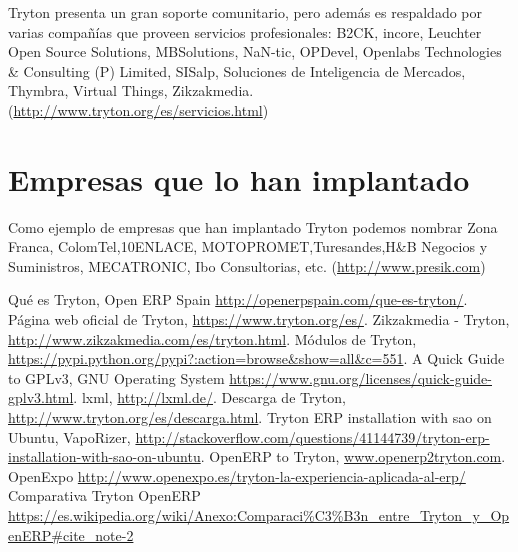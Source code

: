 \documentclass{article}
\begin{document}
Tryton presenta un gran soporte comunitario, pero además es respaldado por varias compañías que proveen servicios profesionales:
B2CK, incore, Leuchter Open Source Solutions, MBSolutions, NaN-tic, OPDevel, Openlabs Technologies  \& Consulting (P) Limited, SISalp, Soluciones de Inteligencia de Mercados, Thymbra,
Virtual Things, Zikzakmedia.(\url{http://www.tryton.org/es/servicios.html})


\section{Empresas que lo han implantado}
Como ejemplo de empresas que han implantado Tryton podemos nombrar Zona Franca, ColomTel,10ENLACE, MOTOPROMET,Turesandes,H\&B Negocios y Suministros, MECATRONIC, Ibo Consultorias, etc.
(\url{http://www.presik.com})

\begin{thebibliography}{99}
 Qué es Tryton, Open ERP Spain \url{http://openerpspain.com/que-es-tryton/}.
 Página web oficial de Tryton, \url{https://www.tryton.org/es/}.
 Zikzakmedia - Tryton, \url{http://www.zikzakmedia.com/es/tryton.html}.
 Módulos de Tryton, \url{https://pypi.python.org/pypi?:action=browse&show=all&c=551}.
 A Quick Guide to GPLv3, GNU Operating System \url{https://www.gnu.org/licenses/quick-guide-gplv3.html}.
 lxml, \url{http://lxml.de/}.
 Descarga de Tryton, \url{http://www.tryton.org/es/descarga.html}.
 Tryton ERP installation with sao on Ubuntu, VapoRizer, \url{http://stackoverflow.com/questions/41144739/tryton-erp-installation-with-sao-on-ubuntu}.
 OpenERP to Tryton, \url{www.openerp2tryton.com}.
OpenExpo \url{http://www.openexpo.es/tryton-la-experiencia-aplicada-al-erp/}
Comparativa Tryton OpenERP \url{https://es.wikipedia.org/wiki/Anexo:Comparaci%C3%B3n_entre_Tryton_y_OpenERP#cite_note-2}
\end{thebibliography}
\end{document}
